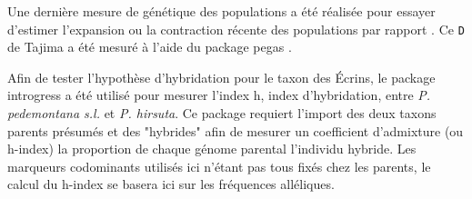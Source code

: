  Une dernière mesure de génétique des populations a été réalisée pour essayer d'estimer l’expansion ou la contraction récente des populations par rapport .
 Ce \verb|D| de Tajima a été mesuré à l'aide du package pegas \citep{Paradis2010}.

Afin de tester l'hypothèse d'hybridation pour le taxon des Écrins, le package introgress \citep{Gompert2010} a été utilisé pour mesurer l'index h, index d'hybridation, entre \textit{P. pedemontana s.l.} et \textit{P. hirsuta}.
 Ce package requiert l'import des deux taxons parents présumés et des "hybrides" afin de mesurer un coefficient d'admixture (ou h-index) \DIFdelbegin {}\DIFdelend \DIFaddbegin {}\DIFaddend la proportion de chaque génome parental \DIFdelbegin {}\DIFdelend \DIFaddbegin {}\DIFaddend l'individu hybride.
 Les marqueurs codominants utilisés ici n'étant pas tous fixés chez les parents, le calcul du h-index se basera ici sur les fréquences alléliques.




